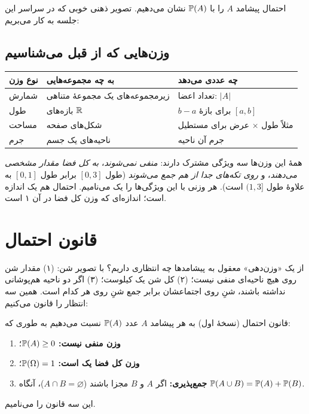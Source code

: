 احتمال پیشامد $A$ را با $\P(A)$ نشان می‌دهیم. تصویر ذهنی خوبی که در سراسر این جلسه به کار می‌بریم: 

\subsection{وزن‌هایی که از قبل می‌شناسیم}

\begin{center}
\renewcommand{\arraystretch}{1.35}
\begin{tabular}{>{\semifont}l l l}
\toprule
نوع وزن & به چه مجموعه‌هایی & چه عددی می‌دهد \\
\midrule
شمارش & زیرمجموعه‌های یک مجموعهٔ متناهی & تعداد اعضا: $|A|$\\
طول & بازه‌های $\R$ & $b-a$ برای بازهٔ $[a,b]$\\
مساحت & شکل‌های صفحه & مثلاً طول $\times$ عرض برای مستطیل\\
جرم & ناحیه‌های یک جسم & جرم آن ناحیه\\
\bottomrule
\end{tabular}
\end{center}

همهٔ این وزن‌ها سه ویژگی مشترک دارند: \emph{منفی نمی‌شوند}، \emph{به کل فضا مقدار مشخصی می‌دهند}، و \emph{روی تکه‌های جدا از هم جمع می‌شوند} (طول $[0,3]$ برابر طول $[0,1]$ به علاوهٔ طول $(1,3]$ است). هر وزنی با این ویژگی‌ها را یک  می‌نامیم. احتمال هم یک اندازه است؛ اندازه‌ای که وزن کل فضا در آن ۱ است.

\section{قانون احتمال}

از یک «وزن‌دهی» معقول به پیشامدها چه انتظاری داریم؟ با تصویر شن:
(۱) مقدار شن روی هیچ ناحیه‌ای منفی نیست؛ (۲) کل شن یک کیلوست؛ (۳) اگر دو ناحیه هم‌پوشانی نداشته باشند، شنِ روی اجتماعشان برابر جمع شنِ روی هر کدام است. همین سه انتظار را قانون می‌کنیم:

\begin{definition}[label=def:law-v1]{قانون احتمال (نسخهٔ اول)}
به هر پیشامد $A$ عدد $\P(A)$ نسبت می‌دهیم به طوری که:
\begin{enumerate}[leftmargin=5.4em]
  \item[\textbf{قانون ۱.}] \textbf{وزن منفی نیست:} \quad $\P(A)\ge0$؛
  \item[\textbf{قانون ۲.}] \textbf{وزن کل فضا یک است:} \quad $\P(\Omega)=1$؛
  \item[\textbf{قانون ۳.}] \textbf{جمع‌پذیری:} \quad اگر $A$ و $B$ مجزا باشند ($A\cap B=\varnothing$)، آنگاه $\P(A\cup B)=\P(A)+\P(B)$.
\end{enumerate}
این سه قانون را  می‌نامیم.
\end{definition}

